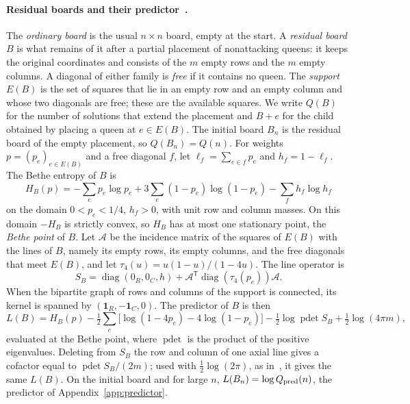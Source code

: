 \paragraph{Residual boards and their predictor~\cite[\S2 and \S6.1]{tc}.} The \emph{ordinary board} is the
usual \(n\times n\) board, empty at the start. A \emph{residual board} \(B\) is what remains of it after
a partial placement of nonattacking queens: it keeps the original coordinates and consists of the \(m\)
empty rows and the \(m\) empty columns. A diagonal of either family is \emph{free} if it contains no queen.
The \emph{support} \(E(B)\) is the set of squares that lie in an empty row and an empty column and whose two
diagonals are free; these are the available squares. We write \(Q(B)\) for the number of solutions that
extend the placement and \(B+e\) for the child obtained by placing a queen at \(e\in E(B)\). The initial
board \(B_n\) is the residual board of the empty placement, so \(Q(B_n)=Q(n)\). For weights
\(p=(p_e)_{e\in E(B)}\) and a free diagonal \(f\), let \(\ell_f=\sum_{e\in f}p_e\) and \(h_f=1-\ell_f\).
The Bethe entropy of \(B\) is
\begin{equation}\label{eq:bethe-residual}
 H_B(p)=-\sum_e p_e\log p_e+3\sum_e(1-p_e)\log(1-p_e)-\sum_f h_f\log h_f
\end{equation}
on the domain \(0<p_e<1/4\), \(h_f>0\), with unit row and column masses. On this domain \(-H_B\) is
strictly convex, so \(H_B\) has at most one stationary point, the \emph{Bethe point} of \(B\). Let
\(\mathcal A\) be the incidence matrix of the squares of \(E(B)\) with the lines of \(B\), namely its empty
rows, its empty columns, and the free diagonals that meet \(E(B)\), and let \(\tau_4(u)=u(1-u)/(1-4u)\). The
line operator is
\[
 S_B=\operatorname{diag}(0_R,0_C,h)+\mathcal A^{\mathsf T}\operatorname{diag}(\tau_4(p_e))\mathcal A .
\]
When the bipartite graph of rows and columns of the support is connected, its kernel is spanned by
\((\mathbf1_R,-\mathbf1_C,0)\). The predictor of \(B\) is then
\begin{equation}\label{eq:predictor-residual}
 L(B)=H_B(p)-\tfrac12\sum_e\bigl[\log(1-4p_e)-4\log(1-p_e)\bigr]-\tfrac12\log\operatorname{pdet}S_B
      +\tfrac12\log(4\pi m),
\end{equation}
evaluated at the Bethe point, where \(\operatorname{pdet}\) is the product of the positive eigenvalues.
Deleting from \(S_B\) the row and column of one axial line gives a cofactor equal to
\(\operatorname{pdet}S_B/(2m)\); used with \(\tfrac12\log(2\pi)\), as in~\cite[\S\S6.1 and 7.1]{pc}, it
gives the same \(L(B)\). On the initial board and for large \(n\), \(L(B_n)=\log Q_{\rm pred}(n)\), the
predictor of Appendix~\ref{app:predictor}.

